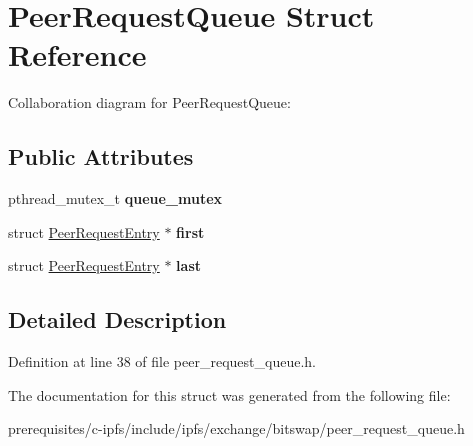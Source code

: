 \hypertarget{struct_peer_request_queue}{}\section{Peer\+Request\+Queue Struct Reference}
\label{struct_peer_request_queue}


Collaboration diagram for Peer\+Request\+Queue\+:
\subsection*{Public Attributes}
\begin{DoxyCompactItemize}
\item 
\mbox{\label{struct_peer_request_queue_a60656d01c926eac0bf682c44c4997338}} 
pthread\+\_\+mutex\+\_\+t {\bfseries queue\+\_\+mutex}
\item 
\mbox{\label{struct_peer_request_queue_ae5978751f7fba25915942696227af4b4}} 
struct \mbox{\hyperlink{struct_peer_request_entry}{Peer\+Request\+Entry}} $\ast$ {\bfseries first}
\item 
\mbox{\label{struct_peer_request_queue_a305b881956e7f209b4af2368d3019a5d}} 
struct \mbox{\hyperlink{struct_peer_request_entry}{Peer\+Request\+Entry}} $\ast$ {\bfseries last}
\end{DoxyCompactItemize}


\subsection{Detailed Description}


Definition at line 38 of file peer\+\_\+request\+\_\+queue.\+h.



The documentation for this struct was generated from the following file\+:\begin{DoxyCompactItemize}
\item 
prerequisites/c-\/ipfs/include/ipfs/exchange/bitswap/peer\+\_\+request\+\_\+queue.\+h\end{DoxyCompactItemize}
